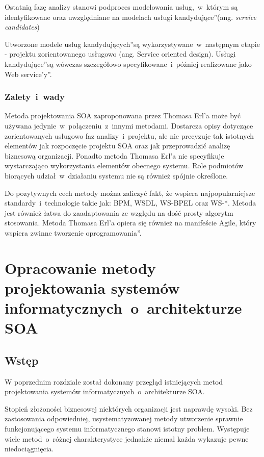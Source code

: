 Ostatnią fazę analizy stanowi podproces modelowania usług,~w~którym są identyfikowane oraz uwzględniane na modelach \quotedblbase usługi kandydujące\textquotedblright (ang. \emph{service candidates}) \cite{CompSOAMet}

Utworzone modele \quotedblbase usług kandydujących\textquotedblright są wykorzystywane~w~następnym etapie - projektu zorientowanego usługowo (ang. Service oriented design). \quotedblbase Usługi kandydujące\textquotedblright są wówczas szczegółowo specyfikowane~i~później realizowane jako \quotedblbase Web service'y\textquotedblright.


\subsection{Zalety~i~wady}
Metoda projektowania SOA zaproponowana przez Thomasa Erl'a może być używana jedynie~w~połączeniu~z~innymi metodami. Dostarcza opisy dotyczące zorientowanych usługowo faz analizy~i~projektu, ale nie precyzuje tak istotnych elementów jak rozpoczęcie projektu SOA oraz jak przeprowadzić analizę biznesową organizacji. Ponadto metoda Thomasa Erl'a nie specyfikuje wystarczająco wykorzystania elementów obecnego systemu. Role podmiotów biorących udział~w~działaniu systemu nie są również spójnie określone.

Do pozytywnych cech metody można zaliczyć fakt, że wspiera najpopularniejsze standardy~i~technologie takie jak: BPM, WSDL, WS-BPEL oraz WS-*. Metoda jest również łatwa do zaadaptowania ze względu na dość prosty algorytm stosowania. Metoda Thomasa Erl'a opiera się również na manifeście Agile, który wspiera \quotedblbase zwinne tworzenie oprogramowania\textquotedblright \cite{OffCompSOAM, RamErvSOA}.

\chapter{Opracowanie metody projektowania systemów informatycznych~o~architekturze SOA}
\section{Wstęp}
W poprzednim rozdziale został dokonany przegląd istniejących metod projektowania systemów informatycznych~o~architekturze SOA.

Stopień złożoności biznesowej niektórych organizacji jest naprawdę wysoki. Bez zastosowania odpowiedniej, usystematyzowanej metody utworzenie sprawnie funkcjonującego systemu informatycznego stanowi istotny problem. Występuje wiele metod~o~różnej charakterystyce jednakże niemal każda wykazuje pewne niedociągnięcia.

